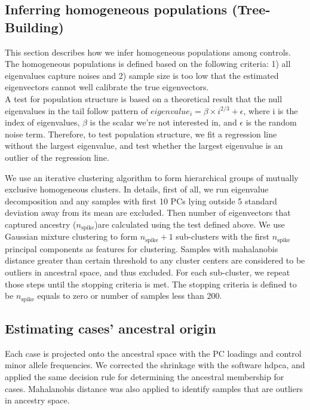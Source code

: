 \documentclass[12pt]{amsart}
\begin{document}
\subsection{Inferring homogeneous populations (Tree-Building)}
This section describes how we infer homogeneous populations among controls. The homogeneous populations is defined based on the following criteria: 1) all eigenvalues capture noises and 2) sample size is too low that the estimated eigenvectors cannot well calibrate the true eigenvectors. \\
A test for population structure is based on a theoretical result that the null eigenvalues in the tail follow pattern of $eigenvalue_i = \beta \times i^{2/3} + \epsilon$, where i is the index of eigenvalues, $\beta$ is the scalar we're not interested in, and $\epsilon$ is the random noise term. Therefore, to test population structure, we fit a regression line without the largest eigenvalue, and test whether the largest eigenvalue is an outlier of the regression line. 

We use an iterative clustering algorithm to form hierarchical groups of mutually exclusive homogeneous clusters. In details, first of all, we run eigenvalue decomposition and any samples with first 10 PCs lying outside 5 standard deviation away from its mean are excluded. Then number of eigenvectors that captured ancestry ($n_{\text{spike}}$)are calculated using the test defined above. We use Gaussian mixture clustering to form $n_{\text{spike}} + 1$ sub-clusters with the first $n_{\text{spike}}$ principal components as features for clustering. Samples with mahalanobis distance greater than certain threshold to any cluster centers are considered to be outliers in ancestral space, and thus excluded. For each sub-cluster, we repeat those steps until the stopping criteria is met. The stopping criteria is defined to be $n_{\text{spike}} $ equals to zero or number of samples less than 200. 


\subsection{Estimating cases' ancestral origin}

Each case is projected onto the ancestral space with the PC loadings and control minor allele frequencies. We corrected the shrinkage with the software hdpca, and applied the same decision rule for determining the ancestral membership for cases. Mahalanobis distance was also applied to identify samples that are outliers in ancestry space. 
\end{document}
